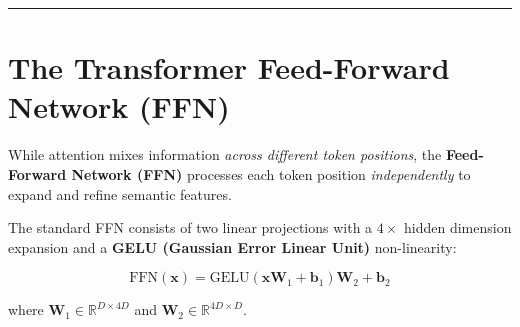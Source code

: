 \documentclass[
  letterpaper,
]{scrbook}
\begin{document}
\begin{center}\rule{0.5\linewidth}{0.5pt}\end{center}

\section{The Transformer Feed-Forward Network
(FFN)}\label{the-transformer-feed-forward-network-ffn}

While attention mixes information \emph{across different token
positions}, the \textbf{Feed-Forward Network (FFN)} processes each token
position \emph{independently} to expand and refine semantic features.

The standard FFN consists of two linear projections with a \(4\times\)
hidden dimension expansion and a \textbf{GELU (Gaussian Error Linear
Unit)} non-linearity:

\[\text{FFN}(\mathbf{x}) = \text{GELU}(\mathbf{x} \mathbf{W}_1 + \mathbf{b}_1) \mathbf{W}_2 + \mathbf{b}_2\]

where \(\mathbf{W}_1 \in \mathbb{R}^{D \times 4D}\) and
\(\mathbf{W}_2 \in \mathbb{R}^{4D \times D}\).
\end{document}
